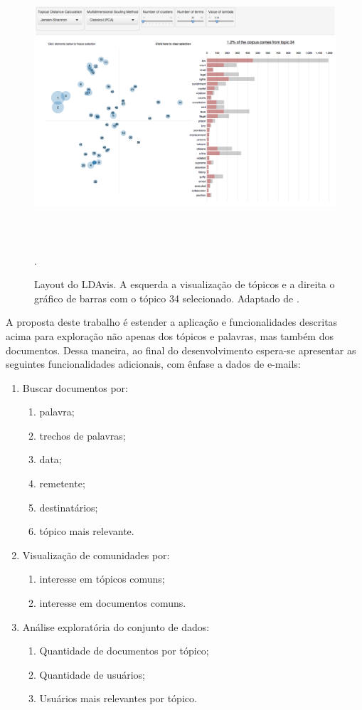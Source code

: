 \documentclass[12pt,a4paper]{article}
\begin{document}
\begin{figure}[H]
	\centering
    \includegraphics[height=10cm]{images/figure_4.png}
    \caption{Layout do LDAvis. A esquerda a visualização de tópicos e a direita o gráfico de barras com o tópico 34 selecionado. Adaptado de \cite{sievert2014ldavis}.}.
    \label{fig-ldavis}
\end{figure}


A proposta deste trabalho é estender a aplicação e funcionalidades descritas acima para exploração não apenas dos tópicos e palavras, mas também dos documentos. Dessa maneira, ao final do desenvolvimento espera-se apresentar as seguintes funcionalidades adicionais, com ênfase a dados de e-mails:

\begin{enumerate}
  \item Buscar documentos por:
  \begin{enumerate}
    \item palavra;
    \item trechos de palavras;
    \item data;
    \item remetente;
    \item destinatários;
    \item tópico mais relevante.
  \end{enumerate}
  \item Visualização de comunidades por:
  \begin{enumerate}
    \item interesse em tópicos comuns;
    \item interesse em documentos comuns.
  \end{enumerate}
  \item Análise exploratória do conjunto de dados:
  \begin{enumerate}
    \item Quantidade de documentos por tópico;
    \item Quantidade de usuários;
    \item Usuários mais relevantes por tópico.
  \end{enumerate}
\end{enumerate}
\end{document}

